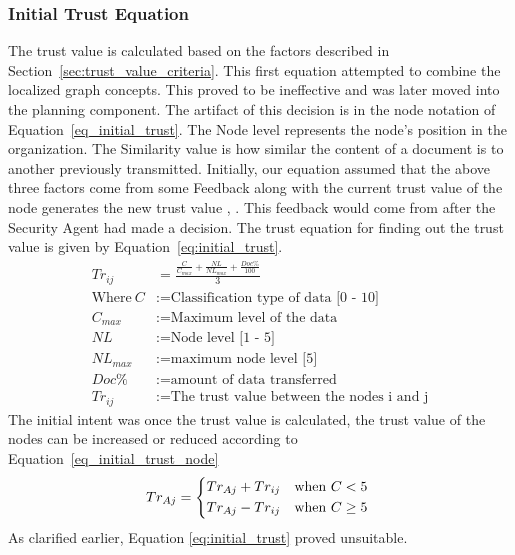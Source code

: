 \subsubsection{Initial Trust Equation}
\label{sec:initial_trust_equation}
The trust value is calculated based on the factors described in
Section~\ref{sec:trust_value_criteria}. This first equation attempted to combine
the localized graph concepts. This
proved to be ineffective and was later moved into the planning component. The
artifact of this decision is in the node notation of
Equation~\ref{eq_initial_trust}. 
The Node level represents the node's
position in the organization. The Similarity value is how similar the content of
a document is to another previously transmitted.  Initially, our equation
assumed that the above three factors come from some
Feedback along with the current trust value of the node generates the new trust
value \autocite{L.Xiong2004}, \autocite{YanWang2007}. This feedback would come
from after the Security Agent had made a decision. The trust equation for
finding out the trust value is given by Equation~\ref{eq:initial_trust}.
\begin{equation}
    \begin{aligned}
         Tr_{ij}&=\frac{\frac{C}{C_{max}} + \frac{NL}{NL_{max}} + \frac{Doc\%}{100}}{3} \\
    \text{Where}~C &:= \text{Classification type of data [0 - 10]} \\
C_{max} &:= \text{Maximum level of the data} \\
NL &:= \text{Node level [1 - 5]} \\
NL_{max} &:= \text{maximum node level [5]} \\
Doc\% &:= \text{amount of data transferred} \\
Tr_{ij} &:= \text{The trust value between the nodes i and j}
    \label{eq:initial_trust}
\end{aligned}
\end{equation}
The initial intent was once the trust value is calculated, the trust
value of the nodes can be increased or reduced according to
Equation~\ref{eq_initial_trust_node}
\begin{equation}
   Tr_{Aj} =    \begin{dcases*}
                    Tr_{Aj} + Tr_{ij} & when $C < 5$\\
                    Tr_{Aj} - Tr_{ij} & when $C \ge 5$
                \end{dcases*}
                \label{eq:initial_trust_node}
\end{equation}
As clarified earlier, Equation \ref{eq:initial_trust} proved unsuitable.


